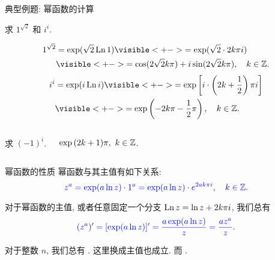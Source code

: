 \begin{frame}[<*>]{典型例题: 幂函数的计算}
\onslide<+->
\vspace{-3pt}
\begin{example}
求 $1^{\sqrt 2}$ 和 $i^i$.
\end{example}
\onslide<+->
\vspace{-3pt}
\begin{solution}
\vspace{-\baselineskip}
\vspace{-3pt}
\begin{align*}
1^{\sqrt2}&=\exp(\sqrt2\Ln1)
\visible<+->{=\exp(\sqrt 2\cdot 2k\pi i)}\\
&\visible<+->{=\cos(2\sqrt 2k\pi)+i\sin(2\sqrt 2k\pi),\quad k\in\BZ.}
\end{align*}
\vspace{-2\baselineskip}
\onslide<+->
\begin{align*}
i^i&=\exp(i\Ln i)
\visible<+->{=\exp\left[i\cdot\left(2k+\frac12\right)\pi i\right]}\\
&\visible<+->{=\exp\left(-2k\pi-\frac12\pi\right),\quad k\in\BZ.}
\end{align*}
\vspace{-\baselineskip}
\vspace{-3pt}
\end{solution}
\vspace{-3pt}
\onslide<+->
\begin{columns}
		\begin{exercise}
		求 $(-1)^i$.
		\end{exercise}
		\onslide<+->
		\begin{answer}
		$\exp{(2k+1)\pi},\ k\in{\mathbb{Z}}$.
		\end{answer}
\end{columns}
\end{frame}


\begin{frame}{幂函数的性质}
幂函数与其主值有如下关系:
\onslide<+->
\[{\color{blue}{z^a=\exp(a\ln z)\cdot 1^a
=\exp(a\ln z)\cdot e^{2ak\pi i},\quad k\in{\mathbb{Z}}.}}\]

\onslide<+->
对于幂函数的主值, 或者任意固定一个分支 $\operatorname{Ln} z=\ln z+2k\pi i$, 我们总有 
\[{\color{blue}{(z^a)'=[\exp(a\ln z)]'=\frac{a\exp(a\ln z)}z=\dfrac{az^a}z}}.\]

\onslide<+->
对于整数 $n$, 我们总有 .
\onslide<+->
这里换成主值也成立.
\onslide<+->
而 .
\end{frame}


